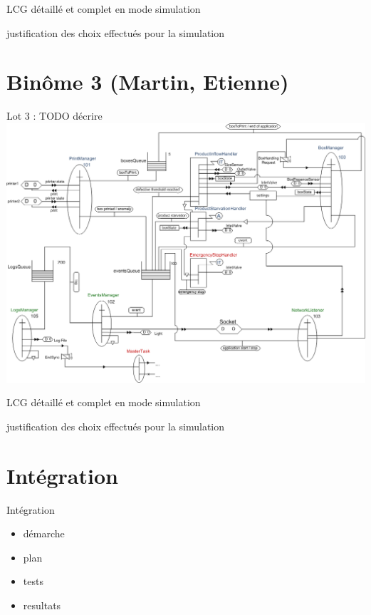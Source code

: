 \documentclass{beamer}
\begin{document}
	\begin{frame}
		LCG détaillé et complet en mode simulation
	\end{frame}

	\begin{frame}
		justification des choix effectués pour la simulation  
	\end{frame}

\section{Binôme 3 (Martin, Etienne)}
	\begin{frame}
	\begin{center}
		\huge Lot 3 : TODO décrire
		\includegraphics[height=0.8\textheight]{../../SchemasLCG/schemaGlobal.png}
	\end{center}
	\end{frame}

	\begin{frame}
		LCG détaillé et complet en mode simulation
	\end{frame}

	\begin{frame}
		justification des choix effectués pour la simulation 
	\end{frame}

\section{Intégration}
	\begin{frame}
		Intégration
		\begin{itemize}
			\item démarche
			\item plan
			\item tests
			\item resultats
		\end{itemize}
	\end{frame}
\end{document}

